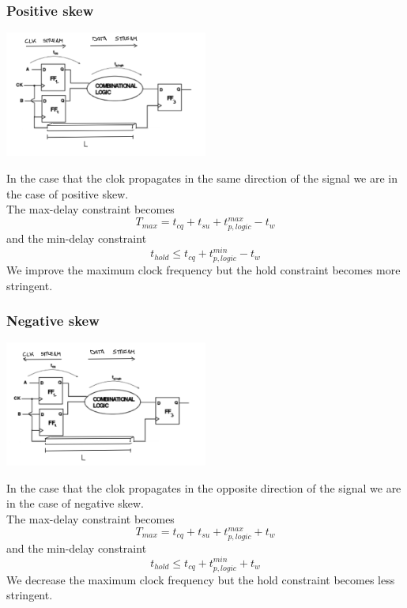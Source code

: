 \subsubsection{Positive skew}

\centering
\includegraphics[width=0.5\textwidth]{C10_6_1.png}\\
\raggedright

In the case that the clok propagates in the same direction of the signal we are in the case of positive skew.\\
The max-delay constraint becomes
\begin{equation}
T_{max}=t_{cq}+t_{su}+ t_{p,logic}^{max}-t_w
\end{equation}
and the min-delay constraint
\begin{equation}
t_{hold} \le t_{cq}+ t_{p,logic}^{min} -t_w
\end{equation}
We improve the maximum clock frequency but the hold constraint becomes more stringent.

\subsubsection{Negative skew}

\centering
\includegraphics[width=0.5\textwidth]{C10_6_2.png}\\
\raggedright

In the case that the clok propagates in the opposite direction of the signal we are in the case of negative skew.\\
The max-delay constraint becomes
\begin{equation}
T_{max}=t_{cq}+t_{su}+ t_{p,logic}^{max}+t_w
\end{equation}
and the min-delay constraint
\begin{equation}
t_{hold} \le t_{cq}+ t_{p,logic}^{min}+t_w
\end{equation}
We decrease the maximum clock frequency but the hold constraint becomes less stringent.

